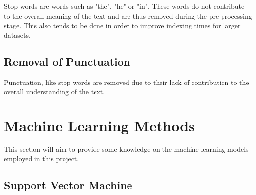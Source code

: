 \documentclass[11pt, a4paper]{article}
\begin{document}
Stop words are words such as "the", "he" or "in". These words do not contribute to the overall meaning of the text and are thus removed during the pre-processing stage. This also tends to be done in order to improve indexing times for larger datasets.

\subsection{Removal of Punctuation}

Punctuation, like stop words are removed due to their lack of contribution to the overall understanding of the text.  

\section{Machine Learning Methods}

This section will aim to provide some knowledge on the machine learning models employed in this project. 

\subsection{Support Vector Machine}
\end{document}
